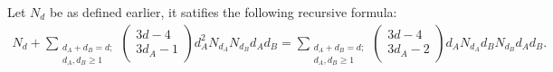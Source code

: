 \begin{theorem}
    Let $N_d$ be as defined earlier, it satifies the following recursive formula:
    \begin{align*}
        N_{d} + \sum_{\substack{d_{A}+d_{B} = d;\\ d_{A},d_{B} \geq 1}}
\begin{pmatrix}
        3d-4\\
        3d_{A} - 1
    \end{pmatrix}
    d^{2}_{A} N_{d_{A}} N_{d_{B}}d_{A} d_{B}
= \sum_{\substack{d_{A}+d_{B} = d;\\ d_{A},d_{B} \geq 1}}
  \begin{pmatrix}
        3d-4\\
        3d_{A} - 2
    \end{pmatrix} d_{A} N_{d_{A}}  d_{B} N_{d_{B}}  d_{A} d_{B}.
    \end{align*}
\end{theorem}
